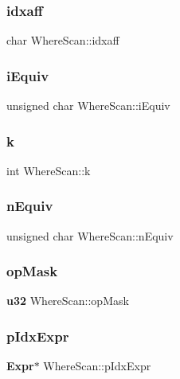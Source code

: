 \mbox{\label{struct_where_scan_ada63a4e977c20a66b858e4b182ff8f87}} 
\subsubsection{idxaff}
{\footnotesize\ttfamily char Where\+Scan\+::idxaff}

\mbox{\label{struct_where_scan_a52812709e4b6257a3084dd091ddaf568}} 
\subsubsection{iEquiv}
{\footnotesize\ttfamily unsigned char Where\+Scan\+::i\+Equiv}

\mbox{\label{struct_where_scan_a51bec89116185e0a611cd4d7fed8847c}} 
\subsubsection{k}
{\footnotesize\ttfamily int Where\+Scan\+::k}

\mbox{\label{struct_where_scan_a80ee79b4e2809c0310a892e93ba5dcfe}} 
\subsubsection{nEquiv}
{\footnotesize\ttfamily unsigned char Where\+Scan\+::n\+Equiv}

\mbox{\label{struct_where_scan_a52f27b144ffed79df3400868e52dd583}} 
\subsubsection{opMask}
{\footnotesize\ttfamily \textbf{ u32} Where\+Scan\+::op\+Mask}

\mbox{\label{struct_where_scan_ae93d54128df8188241c2432b0c394e64}} 
\subsubsection{pIdxExpr}
{\footnotesize\ttfamily \textbf{ Expr}$\ast$ Where\+Scan\+::p\+Idx\+Expr}

